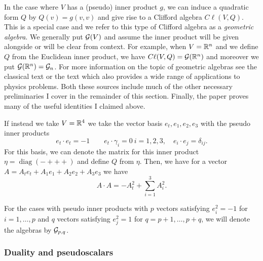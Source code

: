 In the case where $V$ has a (pseudo) inner product $g$, we can induce a quadratic form $Q$ by $Q(v)=g(v,v)$ and give rise to a Clifford algebra $C\ell(V,Q)$.  This is a special case and we refer to this type of Clifford algebra as a \emph{geometric algebra}. We generally put $\mathcal{G}(V)$ and assume the inner product will be given alongside or will be clear from context.  For example, when $V=\mathbb{R}^n$ and we define $Q$ from the Euclidean inner product, we have $C\ell(V,Q)=\mathcal{G}(\mathbb{R}^n)$ and moreover we put $\mathcal{G}(\mathbb{R}^n)=\mathcal{G}_n$. For more information on the topic of geometric algebras see the classical text \cite{hestenes_clifford_1986} or the text \cite{doran_geometric_2003} which also provides a wide range of applications to physics problems. Both these sources include much of the other necessary preliminaries I cover in the remainder of this section. Finally, the paper \cite{chisolm_geometric_2012} proves many of the useful identities I claimed above.

\begin{example}
\label{ex:spacetime_algebra}
If instead we take $V=\mathbb{R}^4$ we take the vector basis $e_t,e_1,e_2,e_3$ with the pseudo inner products
\[
e_t \cdot e_t = -1 \qquad e_t \cdot \gamma_i =0 ~i=1,2,3, \quad e_i \cdot e_j =\delta_{ij}.
\]
For this basis, we can denote the matrix for this inner product $\eta =\operatorname{diag}(-+++)$ and define $Q$ from $\eta$. Then, we have for a vector $A = A_t e_t +A_1 e_1 + A_2 e_2 + A_3 e_3$ we have
\[
A\cdot A = -A_t^2 + \sum_{i=1}^3 A_i^2.
\]
\end{example}

For the cases with pseudo inner products with $p$ vectors satisfying $e_i^2 = -1$ for $i=1,\dots, p$ and $q$ vectors satisfying $e_j^2=1$ for $q=p+1,\dots,p+q$, we will denote the algebras by $\mathcal{G}_{p,q}$.

\subsubsection{Duality and pseudoscalars}
\label{subsection:duality_and_pseudoscalars}

